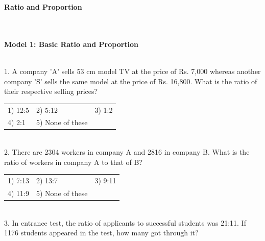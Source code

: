 \documentclass{article}
\begin{document}
	\noindent \begin{center}
		{\Large \textbf{Ratio and Proportion \\}}
	\end{center}
	

	
	\noindent 
	
	\noindent \\  
	
	\noindent \\   \textbf{Model 1: Basic Ratio and Proportion}
	
	\noindent 
	
	\noindent 
	
	\noindent \\   1.   A company 'A' sells 53 cm model TV at the price of Rs. 7,000 whereas another company 'S' sells the same model at the price of Rs. 16,800. What is the ratio of their respective selling prices?
	
	\noindent \begin{tabular}{p{1.7in} p{1.6in} p{1.6in}} \\ 
 1) 12:5                     &  2) 5:12              &  3) 1:2                \\
4) 2:1                & 5) None of these  \\
\end{tabular}
	
	\noindent 
	
	\noindent 
	
	\noindent 
	
	\noindent \\   2.   There are 2304 workers in company A and 2816 in company B. What is the ratio of workers in company A to that of B?
	
	\noindent \begin{tabular}{p{1.7in} p{1.6in} p{1.6in}} \\ 
 1) 7:13                     &  2) 13:7              &  3) 9:11              \\
4) 11:9              & 5) None of these  \\
\end{tabular}
	
	\noindent 
	
	\noindent 
	
	\noindent 
	
	\noindent \\   3.   In entrance test, the ratio of applicants to successful students was 21:11. If 1176 students appeared in the test, how many got through it?
	
\end{document}
